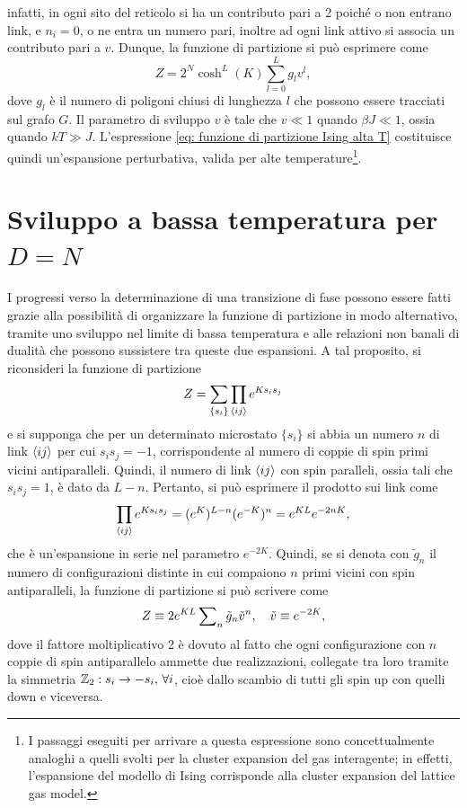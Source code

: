 infatti, in ogni sito del reticolo si ha un contributo pari a 2 poiché o non entrano link, e $n_i = 0$, o ne entra un numero pari, inoltre ad ogni link attivo si associa un contributo pari a $v$. Dunque, la funzione di partizione si può esprimere come
\begin{equation}
\label{eq: funzione di partizione Ising alta T}
    Z = 2^N\cosh^L{(K)}\sum_{l=0}^Lg_lv^l,
\end{equation}
dove $g_l$ è il numero di poligoni chiusi di lunghezza $l$ che possono essere tracciati sul grafo $G$. Il parametro di sviluppo $v$ è tale che $v \ll 1$ quando $\beta J \ll 1$, ossia quando $kT \gg J$. L'espressione \eqref{eq: funzione di partizione Ising alta T} costituisce quindi un'espansione perturbativa, valida per alte temperature\footnote{I passaggi eseguiti per arrivare a questa espressione sono concettualmente analoghi a quelli svolti per la cluster expansion del gas interagente; in effetti, l'espansione del modello di Ising corrisponde alla cluster expansion del lattice gas model.}.

\section{Sviluppo a bassa temperatura per \texorpdfstring{$D = N$}{D = N}}
I progressi verso la determinazione di una transizione di fase possono essere fatti grazie alla possibilità di organizzare la funzione di partizione in modo alternativo, tramite uno sviluppo nel limite di bassa temperatura e alle relazioni non banali di dualità che possono sussistere tra queste due espansioni. A tal proposito, si riconsideri la funzione di partizione 
\begin{equation}
    Z = \sum_{\{s_i\}}\prod_{\langle ij \rangle}e^{Ks_is_j}
\end{equation}
e si supponga che per un determinato microstato $\{s_i\}$ si abbia un numero $n$ di link $\langle ij \rangle$ per cui $s_is_j = -1$, corrispondente al numero di coppie di spin primi vicini antiparalleli. Quindi, il numero di link $\langle ij \rangle$ con spin paralleli, ossia tali che $s_is_j = 1$, è dato da $L - n$. Pertanto, si può esprimere il prodotto sui link come
\begin{equation}
    \prod_{\langle ij \rangle}e^{Ks_is_j} = (e^K)^{L-n}(e^{-K})^{n} = e^{KL}e^{-2nK},
\end{equation}
che è un'espansione in serie nel parametro $e^{-2K}$. Quindi, se si denota con $\tilde{g}_n$ il numero di configurazioni distinte in cui compaiono $n$ primi vicini con spin antiparalleli, la funzione di partizione si può scrivere come
\begin{equation}
\label{eq: funzione di partizione Ising bassa T}
    Z \equiv 2e^{KL}\sum\nolimits_n\tilde{g}_n\tilde{v}^n,\quad \tilde{v} \equiv e^{-2K},
\end{equation}
dove il fattore moltiplicativo 2 è dovuto al fatto che ogni configurazione con $n$ coppie di spin antiparallelo ammette due realizzazioni, collegate tra loro tramite la simmetria $\mathbb{Z}_2 : s_i \to -s_i,\,\forall i$, cioè dallo scambio di tutti gli spin up con quelli down e viceversa.  

